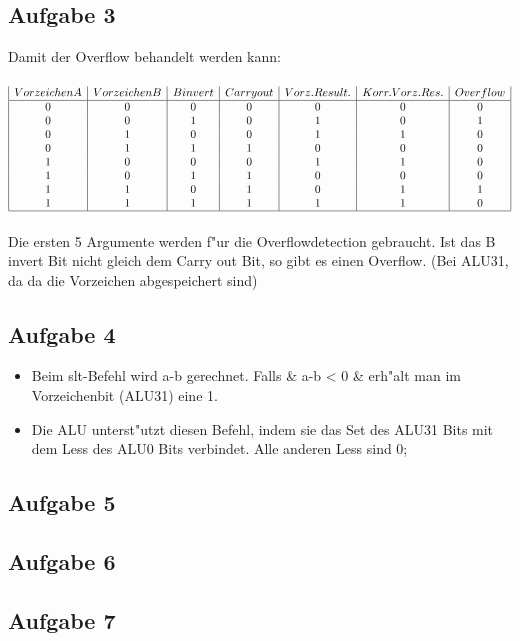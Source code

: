 \documentclass[a4paper,abstracton]{scrartcl}
\begin{document}
\subsection{Aufgabe 3}
Damit der Overflow behandelt werden kann: \\\\
$
\begin{array}{|c|c|c|c|c|c|c|}
Vorzeichen A & Vorzeichen B & B invert & Carry out & Vorz. Result. & Korr. Vorz. Res. & Overflow\\
\hline
0&0&0&0&0&0&0\\
0&0&1&0&1&0&1\\
0&1&0&0&1&1&0\\
0&1&1&1&0&0&0\\
1&0&0&0&1&1&0\\
1&0&1&1&0&0&0\\
1&1&0&1&0&1&1\\
1&1&1&1&1&1&0\\
\hline\end{array}
$ \\\\
Die ersten 5 Argumente werden f"ur die Overflowdetection gebraucht. 
Ist das B invert Bit nicht gleich dem Carry out Bit, so gibt es einen Overflow. (Bei ALU31, da da die Vorzeichen abgespeichert sind)

\subsection{Aufgabe 4}
\begin{itemize}
	\item Beim slt-Befehl wird a-b gerechnet. Falls & a-b < 0 & erh"alt man im Vorzeichenbit (ALU31) eine 1.
	\item Die ALU unterst"utzt diesen Befehl, indem sie das Set des ALU31 Bits mit dem Less des ALU0 Bits verbindet. 
	Alle anderen Less sind 0;
\end{itemize}

\subsection{Aufgabe 5}

\subsection{Aufgabe 6}

\subsection{Aufgabe 7}
\end{document}
